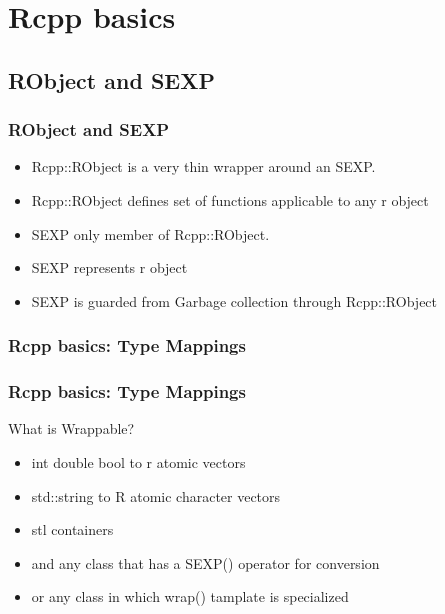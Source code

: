 \documentclass[hyperef={
    colorlinks=true,
    linkcolor=blue,
    filecolor=black,
urlcolor=blue}
]{beamer}
\begin{document}
\section{Rcpp basics}
\subsection{RObject and SEXP}
\begin{frame}
\frametitle{RObject and SEXP}
\begin{itemize}
    \item Rcpp::RObject is a very thin wrapper around an SEXP. 
    \item Rcpp::RObject defines set of functions applicable to any r object
    \item SEXP only member of Rcpp::RObject.
    \item SEXP represents r object
    \item SEXP is guarded from Garbage collection through Rcpp::RObject
\end{itemize}
\end{frame}        

\subsubsection{Rcpp basics: Type Mappings}
\begin{frame}
\frametitle{Rcpp basics: Type Mappings}
    What is Wrappable?
\begin{itemize}
    \item int double bool to r atomic vectors
    \item std::string to R atomic character vectors
    \item stl containers
    \item and any class that has a SEXP() operator for conversion
    \item or any class in which wrap() tamplate is specialized
\end{itemize}
\end{frame}

\end{document}

